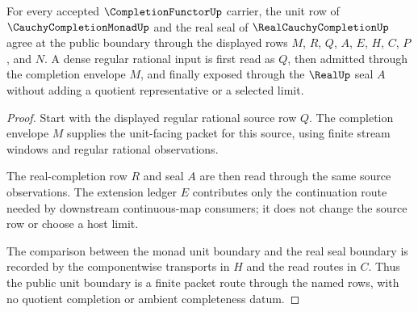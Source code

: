 \begin{theorem}
\label{thm:completion-functor-unit-boundary}
For every accepted $\CompletionFunctorUp$ carrier, the unit row of $\CauchyCompletionMonadUp$ and the real seal of $\RealCauchyCompletionUp$ agree at the public boundary through the displayed rows $M$, $R$, $Q$, $A$, $E$, $H$, $C$, $P$, and $N$. A dense regular rational input is first read as $Q$, then admitted through the completion envelope $M$, and finally exposed through the $\RealUp$ seal $A$ without adding a quotient representative or a selected limit.
\end{theorem}
\begin{proof}
Start with the displayed regular rational source row $Q$. The completion envelope $M$ supplies the unit-facing packet for this source, using finite stream windows and regular rational observations.

The real-completion row $R$ and seal $A$ are then read through the same source observations. The extension ledger $E$ contributes only the continuation route needed by downstream continuous-map consumers; it does not change the source row or choose a host limit.

The comparison between the monad unit boundary and the real seal boundary is recorded by the componentwise transports in $H$ and the read routes in $C$. Thus the public unit boundary is a finite packet route through the named rows, with no quotient completion or ambient completeness datum.
\end{proof}

